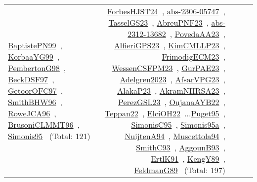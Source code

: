 {\begin{longtable}{p{3cm}r>{\raggedright\arraybackslash}p{6cm}>{\raggedright\arraybackslash}p{6cm}>{\raggedright\arraybackslash}p{8cm}}
\href{../works/BaptistePN99.pdf}{BaptistePN99}~\cite{BaptistePN99}, \href{../works/KorbaaYG99.pdf}{KorbaaYG99}~\cite{KorbaaYG99}, \href{../works/PembertonG98.pdf}{PembertonG98}~\cite{PembertonG98}, \href{../works/BeckDSF97.pdf}{BeckDSF97}~\cite{BeckDSF97}, \href{../works/GetoorOFC97.pdf}{GetoorOFC97}~\cite{GetoorOFC97}, \href{../works/SmithBHW96.pdf}{SmithBHW96}~\cite{SmithBHW96}, \href{../works/RoweJCA96.pdf}{RoweJCA96}~\cite{RoweJCA96}, \href{../works/BrusoniCLMMT96.pdf}{BrusoniCLMMT96}~\cite{BrusoniCLMMT96}, \href{../works/Simonis95.pdf}{Simonis95}~\cite{Simonis95} (Total: 121) & \href{../works/ForbesHJST24.pdf}{ForbesHJST24}~\cite{ForbesHJST24}, \href{../works/abs-2306-05747.pdf}{abs-2306-05747}~\cite{abs-2306-05747}, \href{../works/TasselGS23.pdf}{TasselGS23}~\cite{TasselGS23}, \href{../works/AbreuPNF23.pdf}{AbreuPNF23}~\cite{AbreuPNF23}, \href{../works/abs-2312-13682.pdf}{abs-2312-13682}~\cite{abs-2312-13682}, \href{../works/PovedaAA23.pdf}{PovedaAA23}~\cite{PovedaAA23}, \href{../works/AlfieriGPS23.pdf}{AlfieriGPS23}~\cite{AlfieriGPS23}, \href{../works/KimCMLLP23.pdf}{KimCMLLP23}~\cite{KimCMLLP23}, \href{../works/FrimodigECM23.pdf}{FrimodigECM23}~\cite{FrimodigECM23}, \href{../works/WessenCSFPM23.pdf}{WessenCSFPM23}~\cite{WessenCSFPM23}, \href{../works/GurPAE23.pdf}{GurPAE23}~\cite{GurPAE23}, \href{../works/Adelgren2023.pdf}{Adelgren2023}~\cite{Adelgren2023}, \href{../works/AfsarVPG23.pdf}{AfsarVPG23}~\cite{AfsarVPG23}, \href{../works/AlakaP23.pdf}{AlakaP23}~\cite{AlakaP23}, \href{../works/AkramNHRSA23.pdf}{AkramNHRSA23}~\cite{AkramNHRSA23}, \href{../works/PerezGSL23.pdf}{PerezGSL23}~\cite{PerezGSL23}, \href{../works/OujanaAYB22.pdf}{OujanaAYB22}~\cite{OujanaAYB22}, \href{../works/Teppan22.pdf}{Teppan22}~\cite{Teppan22}, \href{../works/ElciOH22.pdf}{ElciOH22}~\cite{ElciOH22}...\href{../works/Puget95.pdf}{Puget95}~\cite{Puget95}, \href{../works/SimonisC95.pdf}{SimonisC95}~\cite{SimonisC95}, \href{../works/Simonis95a.pdf}{Simonis95a}~\cite{Simonis95a}, \href{../works/NuijtenA94.pdf}{NuijtenA94}~\cite{NuijtenA94}, \href{../works/Muscettola94.pdf}{Muscettola94}~\cite{Muscettola94}, \href{../works/SmithC93.pdf}{SmithC93}~\cite{SmithC93}, \href{../works/AggounB93.pdf}{AggounB93}~\cite{AggounB93}, \href{../works/ErtlK91.pdf}{ErtlK91}~\cite{ErtlK91}, \href{../works/KengY89.pdf}{KengY89}~\cite{KengY89}, \href{../works/FeldmanG89.pdf}{FeldmanG89}~\cite{FeldmanG89} (Total: 197)\\
\end{longtable}
}

\clearpage
